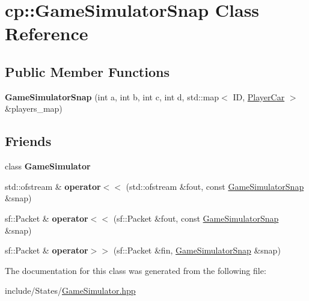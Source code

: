 \hypertarget{classcp_1_1_game_simulator_snap}{}\section{cp\+:\+:Game\+Simulator\+Snap Class Reference}
\label{classcp_1_1_game_simulator_snap}
\subsection*{Public Member Functions}
\begin{DoxyCompactItemize}
\item 
\mbox{\label{classcp_1_1_game_simulator_snap_ab9923e29a6ffd927c5f286210eb4d2c4}} 
{\bfseries Game\+Simulator\+Snap} (int a, int b, int c, int d, std\+::map$<$ ID, \hyperlink{classcp_1_1_player_car}{Player\+Car} $>$ \&players\+\_\+map)
\end{DoxyCompactItemize}
\subsection*{Friends}
\begin{DoxyCompactItemize}
\item 
\mbox{\label{classcp_1_1_game_simulator_snap_a5914b299fccea3f3c5ae2224cd4e2b3e}} 
class {\bfseries Game\+Simulator}
\item 
\mbox{\label{classcp_1_1_game_simulator_snap_a1f116c2d145732cc04ee5dc75555fe75}} 
std\+::ofstream \& {\bfseries operator$<$$<$} (std\+::ofstream \&fout, const \hyperlink{classcp_1_1_game_simulator_snap}{Game\+Simulator\+Snap} \&snap)
\item 
\mbox{\label{classcp_1_1_game_simulator_snap_a8153e2b1eb4cfc4652145b5adcd2b402}} 
sf\+::\+Packet \& {\bfseries operator$<$$<$} (sf\+::\+Packet \&fout, const \hyperlink{classcp_1_1_game_simulator_snap}{Game\+Simulator\+Snap} \&snap)
\item 
\mbox{\label{classcp_1_1_game_simulator_snap_ad7c6e04d3ba040f6bef4f5d6a095989d}} 
sf\+::\+Packet \& {\bfseries operator$>$$>$} (sf\+::\+Packet \&fin, \hyperlink{classcp_1_1_game_simulator_snap}{Game\+Simulator\+Snap} \&snap)
\end{DoxyCompactItemize}


The documentation for this class was generated from the following file\+:\begin{DoxyCompactItemize}
\item 
include/\+States/\hyperlink{_game_simulator_8hpp}{Game\+Simulator.\+hpp}\end{DoxyCompactItemize}
